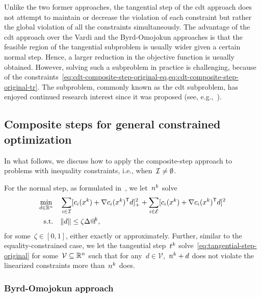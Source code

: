 Unlike the two former approaches, the tangential step of the \gls{cdt} approach does not attempt to maintain or decrease the violation of each constraint but rather the global violation of all the constraints simultaneously.
The advantage of the \gls{cdt} approach over the Vardi and the Byrd-Omojokun approaches is that the feasible region of the tangential subproblem is usually wider given a certain normal step.
Hence, a larger reduction in the objective function is usually obtained.
However, solving such a subproblem in practice is challenging, because of the constraints~\cref{eq:cdt-composite-step-original-eq,eq:cdt-composite-step-original-tr}.
The subproblem, commonly known as the \gls{cdt} subproblem, has enjoyed continued research interest since it was proposed (see, e.g.,~\cite{Chen_Yuan_1999,Ai_Zhang_2009,Bomze_Overton_2015,Bienstock_2016,Xu_Xia_Wang_2021}).

\subsection{Composite steps for general constrained optimization}
\label{subsec:composite-step-inequality}

In what follows, we discuss how to apply the composite-step approach to problems with inequality constraints, i.e., when~$\mathcal{I} \neq \emptyset$.

For the normal step, as formulated in~\cite[\S~15.4.4]{Conn_Gould_Toint_2000}, we let~$\nstep[k]$ solve
\begin{subequations}
    \label{eq:byrd-omojokun}
    \begin{align}
        \min_{\step \in \R^n}   & \quad \sum_{i \in \iub} \posp{\con{i}(\iter[k]) + \nabla \con{i}(\iter[k])^{\T} \step}^2 + \sum_{i \in \ieq} [\con{i}(\iter[k]) + \nabla \con{i}(\iter[k])^{\T} \step]^2 \label{eq:byrd-omojokun-obj}\\
        \text{s.t.}             & \quad \norm{\step} \le \zeta \rad[k],
    \end{align}
\end{subequations}
for some~$\zeta \in [0, 1]$, either exactly or approximately.
Further, similar to the equality-constrained case, we let the tangential step~$\tstep[k]$ solve~\cref{eq:tangential-step-original} for some~$\mathcal{V} \subseteq \mathbb{R}^n$ such that for any~$d \in \mathcal{V}$,~$\nstep[k] + \step$ does not violate the linearized constraints more than~$\nstep[k]$ does.

\subsubsection{Byrd-Omojokun approach}

